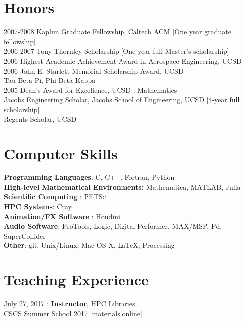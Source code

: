 \section*{Honors}
2007-2008 Kaplun Graduate Fellowship, Caltech ACM [One year graduate fellowship]\\
2006-2007 Tony Thornley Scholarship [One year full Master's scholarship] \\
2006 Highest Academic Achievement Award in Aerospace Engineering, UCSD \\
2006 John E. Starlett Memorial Scholarship Award, UCSD \\
Tau Beta Pi, Phi Beta Kappa \\
2005 Dean's Award for Excellence, UCSD : Mathematics \\
Jacobs Engineering Scholar, Jacobs School of Engineering, UCSD [4-year full scholarship]\\
Regents Scholar, UCSD \\

\section*{Computer Skills}
\textbf{Programming Languages}: C, C++, Fortran, Python \\
\textbf{High-level Mathematical Environments:} Mathematica, MATLAB, Julia\\
\textbf{Scientific Computing} : \textsc{PETSc} \\
\textbf{HPC Systems}: Cray \\
\textbf{Animation/FX Software} : Houdini \\
\textbf{Audio Software}: ProTools, Logic, Digital Performer, MAX/MSP, Pd, SuperCollider\\
\textbf{Other}: git, Unix/Linux, Mac OS X, \LaTeX, Processing

\section*{Teaching Experience}
\label{sec:teaching}


\noindent July 27, 2017 : \textbf{Instructor}, HPC Libraries \\
CSCS Summer School 2017
\href{https://github.com/eth-cscs/SummerSchool2017}{[materials online]}\\

